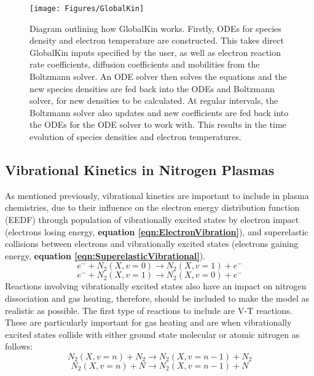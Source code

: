 \documentclass[11pt, oneside]{article}   	%
\begin{document}
\begin{figure}
\centering
\texttt{[image: Figures/GlobalKin]}
\caption{Diagram outlining how GlobalKin works. Firstly, ODEs for species density and electron temperature are constructed. This takes direct GlobalKin inputs specified by the user, as well as electron reaction rate coefficients, diffusion coefficients and mobilities from the Boltzmann solver. An ODE solver then solves the equations and the new species densities are fed back into the ODEs and Boltzmann solver, for new densities to be calculated. At regular intervals, the Boltzmann solver also updates and new coefficients are fed back into the ODEs for the ODE solver to work with. This results in the time evolution of species densities and electron temperatures.}
\label{fig:GlobalKin}
\end{figure}


\subsection{Vibrational Kinetics in Nitrogen Plasmas}

As mentioned previously, vibrational kinetics are important to include in plasma chemistries, due to their influence on the electron energy distribution function (EEDF) through population of vibrationally excited states by electron impact (electrons losing energy, \textbf{equation \ref{eqn:ElectronVibration}}), and superelastic collisions between electrons and vibrationally excited states (electrons gaining energy, \textbf{equation \ref{eqn:SuperelasticVibrational}}).
\begin{equation}
e^- + N_2(X,v=0) \rightarrow N_2(X,v=1) + e^-
\label{eqn:ElectronVibration}
\end{equation}
\begin{equation}
e^- + N_2(X,v=1) \rightarrow N_2(X,v=0) + e^-
\label{eqn:SuperelasticVibrational}
\end{equation}
Reactions involving vibrationally excited states also have an impact on nitrogen dissociation and gas heating, therefore, should be included to make the model as realistic as possible.
The first type of reactions to include are V-T reactions. These are particularly important for gas heating and are when vibrationally excited states collide with either ground state molecular or atomic nitrogen as follows:
\begin{equation}
N_2(X,v=n) + N_2 \rightarrow N_2(X,v=n-1) + N_2
\label{eqn:V-TN2}
\end{equation}
\begin{equation}
N_2(X,v=n) + N \rightarrow N_2(X,v=n-1) + N
\label{eqn:V-TN}
\end{equation}
\end{document}
